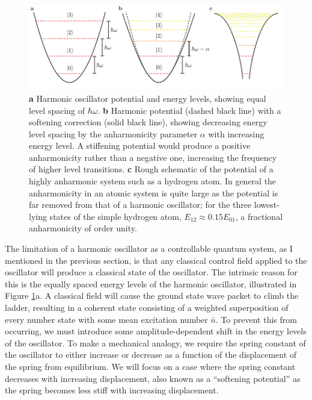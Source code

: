 \begin{figure}
\begin{center}
	\includegraphics[width = 6in]{scqb_chapter/anharmonic_potential}
\end{center}
\caption[Harmonic and anharmonic potential energy and level spacing]{\textbf{a} Harmonic oscillator potential and energy levels, showing equal level spacing of $\hbar \omega$.  \textbf{b} Harmonic potential (dashed black line) with a softening correction (solid black line), showing decreasing energy level spacing by the anharmonicity parameter $\alpha$ with increasing energy level.  A stiffening potential would produce a positive anharmonicity rather than a negative one, increasing the frequency of higher level transitions.  \textbf{c} Rough schematic of the potential of a highly anharmonic system such as a hydrogen atom.  In general the anharmonicity in an atomic system is quite large as the potential is far removed from that of a harmonic oscillator; for the three lowest-lying states of the simple hydrogen atom, $E_{12} \approx 0.15 E_{01}$, a fractional anharmonicity of order unity.}
\label{fig:anh_pot}
\end{figure}

The limitation of a harmonic oscillator as a controllable quantum system, as I mentioned in the previous section, is that any classical control field applied to the oscillator will produce a classical state of the oscillator.  The intrinsic reason for this is the equally spaced energy levels of the harmonic oscillator, illustrated in Figure \ref{fig:anh_pot}a.  A classical field will cause the ground state wave packet to climb the ladder, resulting in a coherent state consisting of a weighted superposition of every number state with some mean excitation number $\bar{n}$.  To prevent this from occurring, we must introduce some amplitude-dependent shift in the energy levels of the oscillator.  To make a mechanical analogy, we require the spring constant of the oscillator to either increase or decrease as a function of the displacement of the spring from equilibrium.  We will focus on a case where the spring constant decreases with increasing displacement, also known as a ``softening potential'' as the spring becomes less stiff with increasing displacement.

